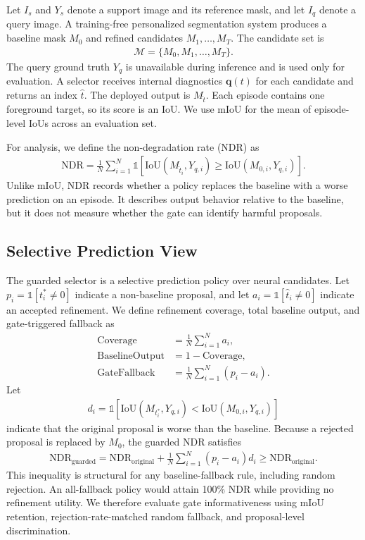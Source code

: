 \documentclass{CVM}
\begin{document}
Let $I_s$ and $Y_s$ denote a support image and its reference mask, and let $I_q$ denote a query image. A training-free personalized segmentation system produces a baseline mask $M_0$ and refined candidates $M_1,\ldots,M_T$. The candidate set is
\begin{align}
\mathcal{M}=\{M_0,M_1,\ldots,M_T\}.
\label{eq:candidates}
\end{align}
The query ground truth $Y_q$ is unavailable during inference and is used only for evaluation. A selector receives internal diagnostics $\mathbf{q}(t)$ for each candidate and returns an index $\hat{t}$. The deployed output is $M_{\hat{t}}$. Each episode contains one foreground target, so its score is an IoU. We use mIoU for the mean of episode-level IoUs across an evaluation set.

For analysis, we define the non-degradation rate (NDR) as
\begin{align}
\mathrm{NDR}=\frac{1}{N}\sum_{i=1}^{N}
\mathbb{1}\left[
\mathrm{IoU}(M_{\hat{t}_i},Y_{q,i})
\geq
\mathrm{IoU}(M_{0,i},Y_{q,i})
\right].
\label{eq:ndr}
\end{align}
Unlike mIoU, NDR records whether a policy replaces the baseline with a worse prediction on an episode. It describes output behavior relative to the baseline, but it does not measure whether the gate can identify harmful proposals.

\subsection{Selective Prediction View}

The guarded selector is a selective prediction policy over neural candidates. Let $p_i=\mathbb{1}[t_i^*\neq 0]$ indicate a non-baseline proposal, and let $a_i=\mathbb{1}[\hat{t}_i\neq 0]$ indicate an accepted refinement. We define refinement coverage, total baseline output, and gate-triggered fallback as
\begin{align}
\mathrm{Coverage}&=\frac{1}{N}\sum_{i=1}^{N}a_i,\\
\mathrm{BaselineOutput}&=1-\mathrm{Coverage},\\
\mathrm{GateFallback}&=\frac{1}{N}\sum_{i=1}^{N}(p_i-a_i).
\label{eq:coverage}
\end{align}
Let
\begin{align}
d_i=\mathbb{1}\left[
\mathrm{IoU}(M_{t_i^*},Y_{q,i})<\mathrm{IoU}(M_{0,i},Y_{q,i})
\right]
\label{eq:proposal_degradation}
\end{align}
indicate that the original proposal is worse than the baseline. Because a rejected proposal is replaced by $M_0$, the guarded NDR satisfies
\begin{align}
\mathrm{NDR}_{\mathrm{guarded}}
=\mathrm{NDR}_{\mathrm{original}}
+\frac{1}{N}\sum_{i=1}^{N}(p_i-a_i)d_i
\geq \mathrm{NDR}_{\mathrm{original}}.
\label{eq:ndr_monotonicity}
\end{align}
This inequality is structural for any baseline-fallback rule, including random rejection. An all-fallback policy would attain 100\% NDR while providing no refinement utility. We therefore evaluate gate informativeness using mIoU retention, rejection-rate-matched random fallback, and proposal-level discrimination.
\end{document}
